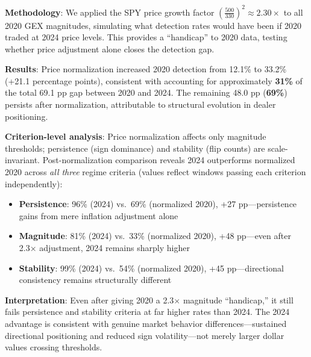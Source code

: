 \noindent\textbf{Methodology}: We applied the SPY price growth factor $\left(\frac{500}{330}\right)^2 \approx 2.30\times$ to all 2020 GEX magnitudes, simulating what detection rates would have been if 2020 traded at 2024 price levels. This provides a ``handicap'' to 2020 data, testing whether price adjustment alone closes the detection gap.

\vspace{0.2cm}

\noindent\textbf{Results}: Price normalization increased 2020 detection from 12.1\% to 33.2\% (+21.1 percentage points), consistent with accounting for approximately \textbf{31\%} of the total 69.1 pp gap between 2020 and 2024. The remaining 48.0 pp (\textbf{69\%}) persists after normalization, attributable to structural evolution in dealer positioning.

\vspace{0.2cm}

\noindent\textbf{Criterion-level analysis}: Price normalization affects only magnitude thresholds; persistence (sign dominance) and stability (flip counts) are scale-invariant. Post-normalization comparison reveals 2024 outperforms normalized 2020 across \textit{all three} regime criteria (values reflect windows passing each criterion independently):

\vspace{0.1cm}

\begin{itemize}
\item \textbf{Persistence}: 96\% (2024) vs.\ 69\% (normalized 2020), +27 pp—persistence gains from mere inflation adjustment alone
\item \textbf{Magnitude}: 81\% (2024) vs.\ 33\% (normalized 2020), +48 pp—even after 2.3× adjustment, 2024 remains sharply higher
\item \textbf{Stability}: 99\% (2024) vs.\ 54\% (normalized 2020), +45 pp—directional consistency remains structurally different
\end{itemize}

\vspace{0.2cm}

\noindent\textbf{Interpretation}: Even after giving 2020 a 2.3$\times$ magnitude ``handicap,'' it still fails persistence and stability criteria at far higher rates than 2024. The 2024 advantage is consistent with genuine market behavior differences—sustained directional positioning and reduced sign volatility—not merely larger dollar values crossing thresholds.

